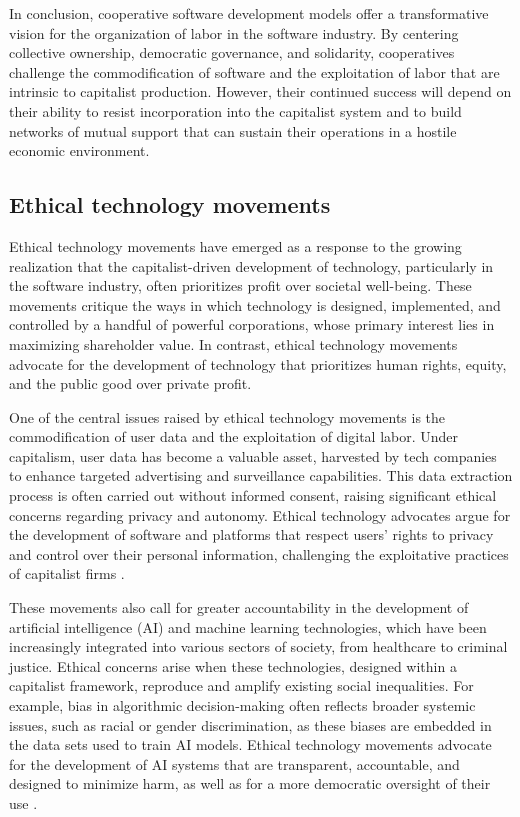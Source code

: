 In conclusion, cooperative software development models offer a transformative vision for the organization of labor in the software industry. By centering collective ownership, democratic governance, and solidarity, cooperatives challenge the commodification of software and the exploitation of labor that are intrinsic to capitalist production. However, their continued success will depend on their ability to resist incorporation into the capitalist system and to build networks of mutual support that can sustain their operations in a hostile economic environment.

\subsection{Ethical technology movements}

Ethical technology movements have emerged as a response to the growing realization that the capitalist-driven development of technology, particularly in the software industry, often prioritizes profit over societal well-being. These movements critique the ways in which technology is designed, implemented, and controlled by a handful of powerful corporations, whose primary interest lies in maximizing shareholder value. In contrast, ethical technology movements advocate for the development of technology that prioritizes human rights, equity, and the public good over private profit.

One of the central issues raised by ethical technology movements is the commodification of user data and the exploitation of digital labor. Under capitalism, user data has become a valuable asset, harvested by tech companies to enhance targeted advertising and surveillance capabilities. This data extraction process is often carried out without informed consent, raising significant ethical concerns regarding privacy and autonomy. Ethical technology advocates argue for the development of software and platforms that respect users' rights to privacy and control over their personal information, challenging the exploitative practices of capitalist firms \cite[pp.~112-114]{zuboff2019}.

These movements also call for greater accountability in the development of artificial intelligence (AI) and machine learning technologies, which have been increasingly integrated into various sectors of society, from healthcare to criminal justice. Ethical concerns arise when these technologies, designed within a capitalist framework, reproduce and amplify existing social inequalities. For example, bias in algorithmic decision-making often reflects broader systemic issues, such as racial or gender discrimination, as these biases are embedded in the data sets used to train AI models. Ethical technology movements advocate for the development of AI systems that are transparent, accountable, and designed to minimize harm, as well as for a more democratic oversight of their use \cite[pp.~153-155]{noble2018}.

